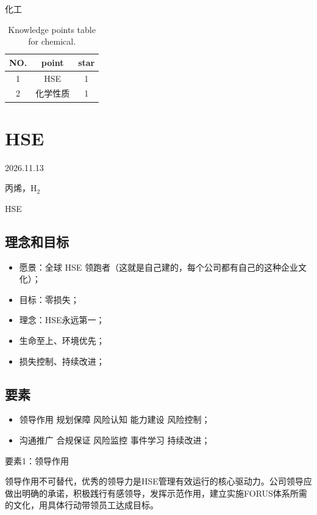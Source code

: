 \documentclass{book}
\begin{document}
\tableofcontents
\clearpage

化工

\begin{table}[htbp]
\centering
\begin{tabular}{c c c} 
\toprule
NO. & point & star\\ [0.5ex] 
\midrule
1 & HSE & 1\\
2 & 化学性质 & 1\\
\bottomrule
\end{tabular}
\caption{Knowledge points table for chemical.}
\label{table:pipeline-knowledge}
\end{table}

\chapter{HSE}

2026.11.13

丙烯，$\mathrm{H_2}$

HSE

\section{理念和目标}

\begin{itemize}
    \item 愿景：全球 HSE 领跑者（这就是自己建的，每个公司都有自己的这种企业文化）；
    \item 目标：零损失；
    \item 理念：HSE永远第一；
    \item 生命至上、环境优先；
    \item 损失控制、持续改进；
\end{itemize}

\section{要素}

\begin{itemize}
    \item 领导作用 规划保障 风险认知 能力建设 风险控制；
    \item 沟通推广 合规保证 风险监控 事件学习 持续改进；
\end{itemize}

要素1：领导作用

领导作用不可替代，优秀的领导力是HSE管理有效运行的核心驱动力。公司领导应做出明确的承诺，积极践行有感领导，发挥示范作用，建立实施FORUS体系所需的文化，用具体行动带领员工达成目标。
\end{document}
